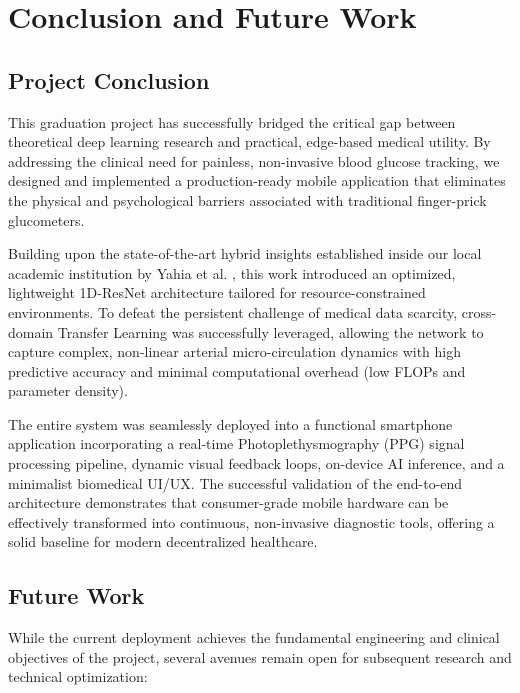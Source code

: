 \clearpage

\chapter{Conclusion and Future Work}
\label{ch:conclusion_future_work}

\section{Project Conclusion}
This graduation project has successfully bridged the critical gap between theoretical deep learning research and practical, edge-based medical utility. By addressing the clinical need for painless, non-invasive blood glucose tracking, we designed and implemented a production-ready mobile application that eliminates the physical and psychological barriers associated with traditional finger-prick glucometers.

Building upon the state-of-the-art hybrid insights established inside our local academic institution by Yahia et al. \cite{ta2026hybrid}, this work introduced an optimized, lightweight 1D-ResNet architecture tailored for resource-constrained environments. To defeat the persistent challenge of medical data scarcity, cross-domain Transfer Learning was successfully leveraged, allowing the network to capture complex, non-linear arterial micro-circulation dynamics with high predictive accuracy and minimal computational overhead (low FLOPs and parameter density).

The entire system was seamlessly deployed into a functional smartphone application incorporating a real-time Photoplethysmography (PPG) signal processing pipeline, dynamic visual feedback loops, on-device AI inference, and a minimalist biomedical UI/UX. The successful validation of the end-to-end architecture demonstrates that consumer-grade mobile hardware can be effectively transformed into continuous, non-invasive diagnostic tools, offering a solid baseline for modern decentralized healthcare.

\section{Future Work}
While the current deployment achieves the fundamental engineering and clinical objectives of the project, several avenues remain open for subsequent research and technical optimization:

